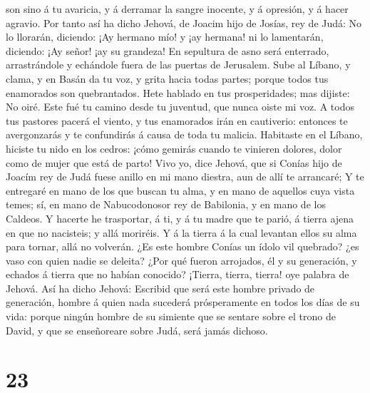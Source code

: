 son sino á tu avaricia, y á derramar la sangre inocente, y á opresión, y
á hacer agravio.  Por tanto así ha dicho Jehová, de Joacim
hijo de Josías, rey de Judá: No lo llorarán, diciendo: ¡Ay hermano mío!
y ¡ay hermana! ni lo lamentarán, diciendo: ¡Ay señor! ¡ay su grandeza!
 En sepultura de asno será enterrado, arrastrándole y
echándole fuera de las puertas de Jerusalem.  Sube al
Líbano, y clama, y en Basán da tu voz, y grita hacia todas partes;
porque todos tus enamorados son quebrantados.  Hete hablado
en tus prosperidades; mas dijiste: No oiré. Este fué tu camino desde tu
juventud, que nunca oiste mi voz.  A todos tus pastores
pacerá el viento, y tus enamorados irán en cautiverio: entonces te
avergonzarás y te confundirás á causa de toda tu malicia. 
Habitaste en el Líbano, hiciste tu nido en los cedros: ¡cómo gemirás
cuando te vinieren dolores, dolor como de mujer que está de parto!
 Vivo yo, dice Jehová, que si Conías hijo de Joacím rey de
Judá fuese anillo en mi mano diestra, aun de allí te arrancaré;
 Y te entregaré en mano de los que buscan tu alma, y en
mano de aquellos cuya vista temes; sí, en mano de Nabucodonosor rey de
Babilonia, y en mano de los Caldeos.  Y hacerte he
trasportar, á ti, y á tu madre que te parió, á tierra ajena en que no
nacisteis; y allá moriréis.  Y á la tierra á la cual
levantan ellos su alma para tornar, allá no volverán.  ¿Es
este hombre Conías un ídolo vil quebrado? ¿es vaso con quien nadie se
deleita? ¿Por qué fueron arrojados, él y su generación, y echados á
tierra que no habían conocido?  ¡Tierra, tierra, tierra!
oye palabra de Jehová.  Así ha dicho Jehová: Escribid que
será este hombre privado de generación, hombre á quien nada sucederá
prósperamente en todos los días de su vida: porque ningún hombre de su
simiente que se sentare sobre el trono de David, y que se enseñoreare
sobre Judá, será jamás dichoso.

\hypertarget{section-22}{%
\section{23}\label{section-22}}

